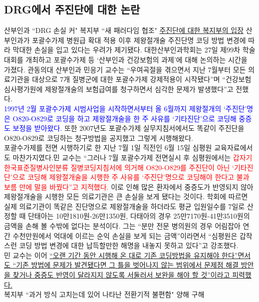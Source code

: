 \subsection{DRG에서 주진단에 대한 논란}
\begin{hemphsentense}{산부인과 ``DRG 손실 커" 복지부 ``새 패러다임 협조"}
\href{https://dailymedi.com/news/view.html?section=1&category=5&no=771918}{주진단에 대한 복지부의 입장}
산부인과가 포괄수가제 병원급 확대 적용 이후 제왕절개술 주진단명 코딩 방법 변경에 따라 막대한 손실을 입고 있다는 우려가 제기됐다.
대한산부인과학회는 27일 제99차 학술대회를 개최하고 포괄수가제 등 ‘산부인과 건강보험의 과제’에 대해 논의하는 시간을 가졌다. 관동의대 산부인과 민응기 교수는 “우여곡절을 겪으면서 지난 7월부터 모든 의료기관을 대상으로 7개 질병군에 대한 포괄수가제 강제적용이 시작됐다”며 “건강보험심사평가원에 제왕절개술의 보험급여를 청구하면서 심각한 문제가 발생했다”고 전했다.\\
\textcolor{blue}{1997년 2월 포괄수가제 시범사업을 시작하면서부터 올 6월까지 제왕절개의 ‘주진단’명은 O820-O829로 코딩을 하고 제왕절개술을 한 주 사유를 `기타진단’으로 코딩해 중증도 보정을 받아왔다.} 또한 2007년도 포괄수가제 실무지침서에서도 똑같이 주진단을 O820-O829로 코딩하는 청구방법을 공지했고 그렇게 시행해왔다.\\
포괄수가제를 전면 시행하기로 한 지난 7월 1일 직전인 6월 15일 심평원 교육자료에서도 마찬가지였다.민 교수는 “그러나 7월 포괄수가제 전면실시 후 심평원에서는 \textcolor{red}{갑자기 한국표준질병사인분류 질병코딩지침서에 의거해 O820-O829를 주진단이 아닌 ‘기타진단’으로 코딩해 제왕절개술을 시행한 주 사유를 ‘주진단’명으로 코딩해야 한다고 불과 보름 만에 말을 바꿨다”고 지적했다.} 이로 인해 많은 환자에서 중증도가 반영되지 않아 제왕절개술을 시행한 모든 의료기관은 큰 손실을 보게 됐다는 것이다. 학회에 따르면 실제 의료기관이 똑같은 진단명으로 제왕절개술을 하더라도 평균 입원일수를 7일로 산정할 때 단태아는 10만1810원-26만1350원, 다태아의 경우 25만7170원-41만3510원의 금액을 손해 볼 수밖에 없다는 분석이다. 그는 “분만 전문 병의원의 경우 어림잡아 연간 수천만원에서 억대에 이르는 순익 손실을 보게 되는 금액”이라면서 “심평원은 갑작스런 코딩 방법 변경에 대한 납득할만한 해명을 내놓지 못하고 있다”고 강조했다.\\
민 교수는 이어 \uline{“오랜 기간 동안 시행해 온 대로 기존 코딩방법을 유지해야 한다”면서도 “기존 방법에 문제가 발견됐다면 그 틀을 벗어나지 않는 범위에서 문제점 해결 방안을 찾거나 중증도 반영이 달라지지 않도록 서둘러서 보완을 해야 할 것”이라고 피력했다.}\\
복지부 ``과거 방식 고치는데 있어 나타난 전환기적 불편함" 양해 구해\\

\end{hemphsentense}
